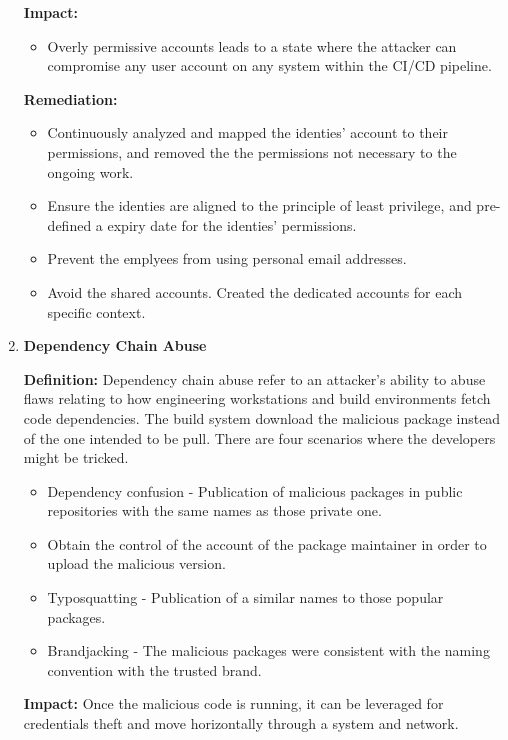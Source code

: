 \begin{enumerate}[label=(\arabic*)]
    \textbf{Impact: }
        \begin{itemize}
            \item Overly permissive accounts leads to a state where the attacker can compromise any user
            account on any system within the CI/CD pipeline.
        \end{itemize}

    \textbf{Remediation:}
        \begin{itemize}
            \item Continuously analyzed and mapped the identies' account to their permissions, and removed the 
            the permissions not necessary to the ongoing work.
            \item Ensure the identies are aligned to the principle of least privilege, and pre-defined a expiry date 
            for the identies' permissions.
            \item Prevent the emplyees from using personal email addresses.
            \item Avoid the shared accounts. Created the dedicated accounts for each specific context.
        \end{itemize}
    \item \textbf{Dependency Chain Abuse}

    \textbf{Definition: }
        Dependency chain abuse refer to an attacker's ability to abuse flaws relating to how 
        engineering workstations and build environments fetch code dependencies. The build system download the 
        malicious package instead of the one intended to be pull. There are four scenarios where the developers might be tricked.
        \begin{itemize}
            \item Dependency confusion - Publication of malicious packages in public repositories with the same 
            names as those private one.
            \item Obtain the control of the account of the package maintainer in order to upload the malicious version.
            \item Typosquatting - Publication of a similar names to those popular packages.
            \item Brandjacking - The malicious packages were consistent with the naming convention with the trusted brand.
        \end{itemize}

    \textbf{Impact: }
        Once the malicious code is running, it can be leveraged for credentials theft and move horizontally through a system and 
        network.


\end{enumerate}
